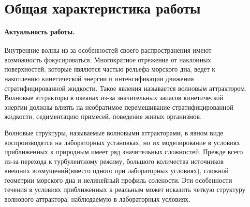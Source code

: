 \documentclass[utf8x]{G7-32} %
\begin{document}
\setcounter{secnumdepth}{-1}

\section{Общая характеристика работы}


\paragraph{Актуальность работы.}

Внутренние волны из-за особенностей своего распространения имеют возможность фокусироваться. Многократное отрежение от наклонных поверхностей, которые явялются частью рельефа морского дна, ведет к накоплению кинетической энергии и интенсификации движения стратифицированной жидкости. Такое явления называется волновым аттрактором. Волновые аттракторы в океанах из-за значительных запасов кинетической энергии должны влиять на необратимое перемешивание стратифицированной жидкости, седиментацию примесей, поведение живых организмов. 

Волновые структуры, называемые волновыми аттракторами, в явном виде воспроизводятся на лабораторных установках, но их моделирование в условиях приближенных к природным имеет ряд значительных сложностей. Прежде всего из-за перехода к турбулентному режиму, большого количества источников внешних возмущений(вместо одного при лабораторных условиях), сложной геометрии морского дна и нелинейный профиль солености. Эти особенности течения в условиях приближенных к реальным может исказить четкую структуру волнового аттрактора, наблюдаемую в лабораторных условиях. 
\end{document}
